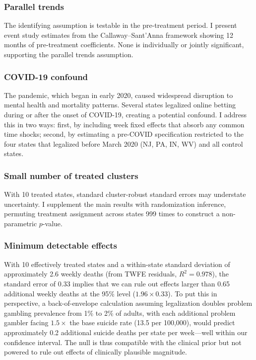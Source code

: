 \documentclass[12pt]{article}
\begin{document}
\subsubsection*{Parallel trends} The identifying assumption is testable in the pre-treatment period. I present event study estimates from the Callaway--Sant'Anna framework showing 12 months of pre-treatment coefficients. None is individually or jointly significant, supporting the parallel trends assumption.

\subsubsection*{COVID-19 confound} The pandemic, which began in early 2020, caused widespread disruption to mental health and mortality patterns. Several states legalized online betting during or after the onset of COVID-19, creating a potential confound. I address this in two ways: first, by including week fixed effects that absorb any common time shocks; second, by estimating a pre-COVID specification restricted to the four states that legalized before March 2020 (NJ, PA, IN, WV) and all control states.

\subsubsection*{Small number of treated clusters} With 10 treated states, standard cluster-robust standard errors may understate uncertainty. I supplement the main results with randomization inference, permuting treatment assignment across states 999 times to construct a non-parametric $p$-value.

\subsubsection*{Minimum detectable effects} With 10 effectively treated states and a within-state standard deviation of approximately 2.6 weekly deaths (from TWFE residuals, $R^2 = 0.978$), the standard error of 0.33 implies that we can rule out effects larger than 0.65 additional weekly deaths at the 95\% level ($1.96 \times 0.33$). To put this in perspective, a back-of-envelope calculation assuming legalization doubles problem gambling prevalence from 1\% to 2\% of adults, with each additional problem gambler facing $1.5\times$ the base suicide rate (13.5 per 100,000), would predict approximately 0.2 additional suicide deaths per state per week---well within our confidence interval. The null is thus compatible with the clinical prior but not powered to rule out effects of clinically plausible magnitude.
\end{document}

